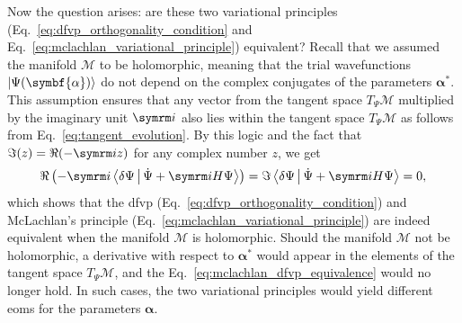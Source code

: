 Now the question arises: are these two variational principles (Eq.~\eqref{eq:dfvp_orthogonality_condition} and Eq.~\eqref{eq:mclachlan_variational_principle}) equivalent? Recall that we assumed the manifold $\mathcal{M}$ to be holomorphic, meaning that the trial wavefunctions $\ket{\Psi(\symbf{\alpha})}$ do not depend on the complex conjugates of the parameters $\symbf{\alpha}^\ast$. This assumption ensures that any vector from the tangent space $T_{\Psi}\mathcal{M}$ multiplied by the imaginary unit $\i$ also lies within the tangent space $T_{\Psi}\mathcal{M}$ as follows from Eq.~\eqref{eq:tangent_evolution}. By this logic and the fact that $\Im(z)=\Re(-\i z)$ for any complex number $z$, we get
\begin{equation}\label{eq:mclachlan_dfvp_equivalence}
\Re\left(-\i\Braket{\delta\Psi|\dot\Psi+\i H\Psi}\right)=\Im\Braket{\delta\Psi|\dot\Psi+\i H\Psi}=0,
\end{equation}
which shows that the \gls{dfvp} (Eq.~\eqref{eq:dfvp_orthogonality_condition}) and McLachlan's principle (Eq.~\eqref{eq:mclachlan_variational_principle}) are indeed equivalent when the manifold $\mathcal{M}$ is holomorphic. Should the manifold $\mathcal{M}$ not be holomorphic, a derivative with respect to $\symbf{\alpha}^\ast$ would appear in the elements of the tangent space $T_{\Psi}\mathcal{M}$, and the Eq.~\eqref{eq:mclachlan_dfvp_equivalence} would no longer hold. In such cases, the two variational principles would yield different \glspl{eom} for the parameters $\symbf{\alpha}$.\supercite{297500112}
